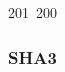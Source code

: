201~200~\documentclass{article}
\begin{document}
	                                                                                                                                                                                                                                                                                                	                                                                                                                                        	    	                                                                                                	                                                                                                                                                                                                                                                                                                                                	                                                                        	                                                                        	                                                                                                                                        	                                                                        \clearpage

	                                                                                                                                                                                                                                                                                                	                                                                                                                                        	    	                                                                                                	                                                                                                                                                                                                                                                                                                                                	                                                                        	                                                                        	                                                                                                                                        	                                                                        \subsubsection{SHA3}
\end{document}
